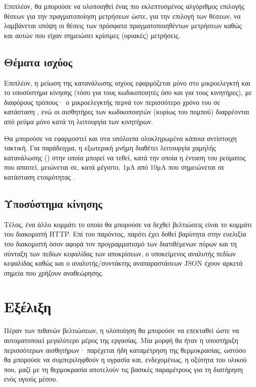 Επιπλέον, θα μπορούσε να υλοποιηθεί ένας πιο εκλεπτυσμένος αλγόριθμος επιλογής
θέσεων για την πραγματοποίηση μετρήσεων ώστε, για την επιλογή των θέσεων, να
λαμβάνεται υπόψη οι θέσεις των πρόσφατα πραγματοποιηθέντων μετρήσεων καθώς
και αυτών που είχαν σημειώσει κρίσιμες (οριακές) μετρήσεις.


\subsection*{Θέματα ισχύος}

Επιπλέον, η μείωση της κατανάλωσης ισχύος εφαρμόζεται μόνο στο μικροελεγκτή και
το υποσύστημα κίνησης (τόσο για τους κωδικοποιητές όσο και για τους κινητήρες),
με διαφόρους τρόπους· ο μικροελεγκτής περνά τον περισσότερο χρόνο του σε
κατάσταση , ενώ οι αισθητήρες των κωδικοποιητών (κυρίως του
πομπού) διαρρέονται από ρεύμα μόνο κατά τη λειτουργία των κινητήρων.

Θα μπορούσε να εφαρμοστεί και στα υπόλοιπα ολοκληρωμένα κάποια αντίστοιχη
τακτική. Για παράδειγμα, η εξωτερική μνήμη  διαθέτει λειτουργία
χαμηλής κατανάλωσης () στην οποία μπορεί να τεθεί, κατά
την οποία η ένταση του ρεύματος που απαιτεί, μειώνεται σε, κατά μέγιστο, 1μA από
10μA που σημειώνεται σε κατάσταση ετοιμότητας \parencite[2,16]{25lc1024}.


\subsection*{Υποσύστημα κίνησης}

Τέλος, ένα άλλο κομμάτι το οποίο θα μπορούσε να δεχθεί βελτιώσεις είναι το
κομμάτι του διακομιστή HTTP. Επί του παρόντος, παρότι έχει δοθεί βαρύτητα στην
ευελιξία του διακομιστή όσον αφορά τον προγραμματισμό των διατιθέμενων πόρων και
τη σύνταξη των πεδίων κεφαλίδας των αποκρίσεων, ο υποκείμενος αναλυτής πεδίων
κεφαλίδας καθώς και ο αναλυτής\slash{}συντάκτης αναπαραστάσεων JSON έχουν αρκετά
σημεία που χρήζουν αναθεώρησης.


\section{Εξέλιξη}

Πέραν των πιθανών βελτιώσεων, η υλοποίηση θα μπορούσε να επεκταθεί ώστε να
αυτοματοποιεί μεγαλύτερο μέρος της εργασίας. Μία μορφή θα ήταν η υποστήριξη
περισσότερων αισθητήρων· παρέχεται ήδη καταμέτρηση της θερμοκρασίας, ωστόσο θα
μπορούσε να συμπεριληφθούν η υγρασία και, ενδεχομένως, η οξύτητα του υλικού που,
μαζί με τη θερμοκρασία αποτελούν τις βασικές παραμέτρους για τη διατήρηση ενός
υγιούς μέσου.

